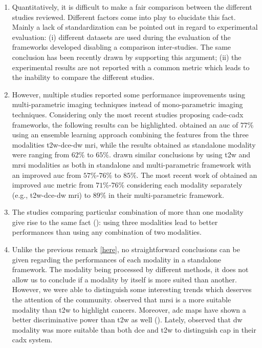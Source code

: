 \begin{enumerate}
	\item Quantitatively, it is difficult to make a fair comparison between the different studies reviewed. Different factors come into play to elucidate this fact. Mainly a lack of standardization can be pointed out in regard to experimental evaluation: (i) different datasets are used during the evaluation of the frameworks developed disabling a comparison inter-studies. The same conclusion has been recently drawn by \cite{Litjens2014} supporting this argument; (ii) the experimental results are not reported with a common metric which leads to the inability to compare the different studies.
	
	\item \label{here} However, multiple studies reported some performance improvements using multi-parametric imaging techniques instead of mono-parametric imaging techniques. Considering only the most recent studies proposing \ac{cade}-\ac{cadx} frameworks, the following results can be highlighted. 	
	\cite{Viswanath2011} obtained an \ac{auc} of $77\%$ using an ensemble learning approach combining the features from the three modalities \ac{t2w}-\ac{dce}-\ac{dw} \ac{mri}, while the results obtained as standalone modality were ranging from $62\%$ to $65\%$. 	
	\cite{Tiwari2013} drawn similar conclusions by using \ac{t2w} and \ac{mrsi} modalities as both in standalone and multi-parametric framework with an improved \ac{auc} from $57\%$-$76\%$ to $85\%$. 	
	The most recent work of \cite{Litjens2014} obtained an improved \ac{auc} metric from $71\%$-$76\%$ considering each modality separately (e.g., \ac{t2w}-\ac{dce}-\ac{dw} \ac{mri}) to $89\%$ in their multi-parametric framework.
	
		\item The studies comparing particular combination of more than one modality give rise to the same fact (\cite{Ozer2010,Litjens2011,Liu2013,Litjens2014}): using three modalities lead to better performances than using any combination of two modalities. 
	
	\item Unlike the previous remark \ref{here}, no straightforward conclusions can be given regarding the performances of each modality in a standalone framework. The modality being processed by different methods, it does not allow us to conclude if a modality by itself is more suited than another. However, we were able to distinguish some interesting trends which deserves the attention of the community. \cite{Tiwari2009a,Tiwari2012,Tiwari2013} observed that \ac{mrsi} is a more suitable modality than \ac{t2w} to highlight cancers. Moreover, \ac{adc} maps have shown a better discriminative power than \ac{t2w} as well (\cite{Langer2009,Viswanath2011,Peng2013}). Lately, \cite{Litjens2014} observed that \ac{dw} modality was more suitable than both \ac{dce} and \ac{t2w} to distinguish \ac{cap} in their \ac{cadx} system. 


\end{enumerate}
